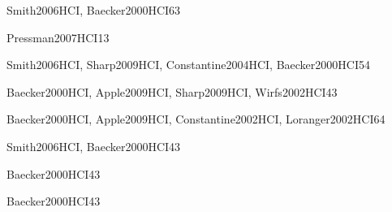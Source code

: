 \begin{syllabus}
	\begin{unit}{\HCIFoundations}{}{Smith2006HCI, Baecker2000HCI}{6}{3}
		\HCIFoundationsAllTopics
		\HCIFoundationsAllLearningOutcomes
	\end{unit}
	
	\begin{unit}{\PLObjectOrientedProgramming}{}{Pressman2007HCI}{1}{3}
		\PLObjectOrientedProgramming
	\end{unit}
	
	
	\begin{unit}{\HCIUsercentereddesignandtesting}{}{Smith2006HCI, Sharp2009HCI, Constantine2004HCI, Baecker2000HCI}{5}{4}
		\HCIUsercentereddesignandtestingAllTopics
		\HCIUsercentereddesignandtestingAllLearningOutcomes
	\end{unit}
	
	
	\begin{unit}{\HCIDesigningInteraction}{}{Baecker2000HCI, Apple2009HCI, Sharp2009HCI, Wirfs2002HCI}{4}{3}
		\HCIDesigningInteractionAllTopics
		\HCIDesigningInteractionAllLearningOutcomes
	\end{unit}
	
	\begin{unit}{\ARInterfacingandcommunication}{}{Baecker2000HCI, Apple2009HCI, Constantine2002HCI, Loranger2002HCI}{6}{4}
		\ARInterfacingandcommunicationAllTopics
		\ARInterfacingandcommunicationAllLearningOutcomes
	\end{unit}
	
	
	\begin{unit}{\IMMultimediaSystems}{}{Smith2006HCI, Baecker2000HCI}{4}{3}
		\IMMultimediaSystemsAllTopics
		\IMMultimediaSystemsAllLearningOutcomes
	\end{unit}
	
	\begin{unit}{\SPProfessionalCommunication}{}{Baecker2000HCI}{4}{3}
		\SPProfessionalCommunicationAllTopics
		\SPProfessionalCommunicationAllLearningOutcomes
	\end{unit}
	
	
	\begin{unit}{\HCIHumanfactorsandsecurity}{}{Baecker2000HCI}{4}{3}
		\HCIHumanfactorsandsecurityAllTopics
		\HCIHumanfactorsandsecurityAllLearningOutcomes
	\end{unit}
	
	\begin{coursebibliography}
	\end{coursebibliography}
	\end{syllabus}
	